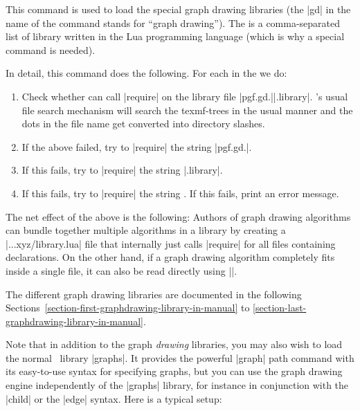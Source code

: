 \begin{command}{\usegdlibrary{}}
    This command is used to load the special graph drawing libraries (the |gd|
    in the name of the command stands for ``graph drawing''). The  is a comma-separated list of library written in the Lua
    programming language (which is why a special command is needed).

    In detail, this command does the following. For each  in the
     we do:
    \begin{enumerate}
        \item Check whether  can call |require| on the library file
            |pgf.gd.||.library|. 's usual file search
            mechanism  will search the texmf-trees in the usual manner and the
            dots in the file name get converted into directory slashes.
        \item If the above failed, try to |require| the string
            |pgf.gd.|.
        \item If this fails, try to |require| the string |.library|.
        \item If this fails, try to |require| the string . If this
            fails, print an error message.
    \end{enumerate}
    The net effect of the above is the following: Authors of graph drawing
    algorithms can bundle together multiple algorithms in a library by creating
    a |...xyz/library.lua| file that internally just calls |require| for all
    files containing declarations. On the other hand, if a graph drawing
    algorithm completely fits inside a single file, it can also be read
    directly using |\usegdlibrary|.
\begin{codeexample}
\usetikzlibrary{graphdrawing}
\end{codeexample}

    The different graph drawing libraries are documented in the following
    Sections~\ref{section-first-graphdrawing-library-in-manual} to
    \ref{section-last-graphdrawing-library-in-manual}.
\end{command}

Note that in addition to the graph \emph{drawing} libraries, you may also wish
to load the normal \tikzname\ library |graphs|. It provides the powerful
|graph| path command with its easy-to-use syntax for specifying graphs, but you
can use the graph drawing engine independently of the |graphs| library, for
instance in conjunction with the |child| or the |edge| syntax. Here is a
typical setup:
%
\begin{codeexample}
\usetikzlibrary{graphs, graphdrawing}
\end{codeexample}

